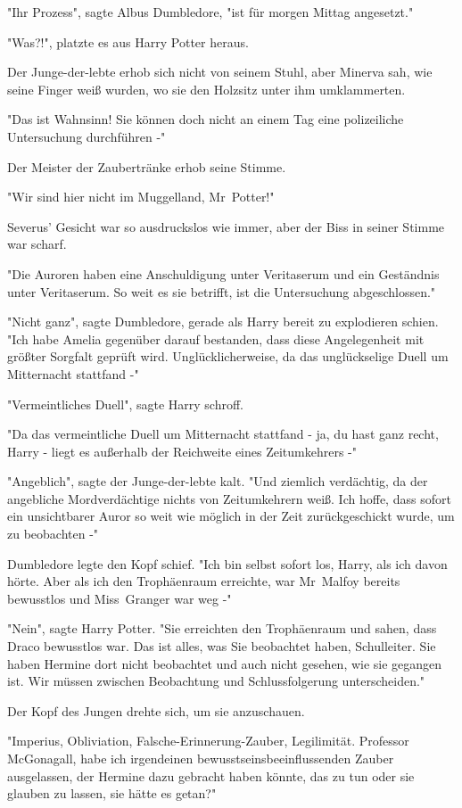 {"Ihr Prozess", sagte Albus Dumbledore, "ist für morgen Mittag angesetzt."

"Was?!", platzte es aus Harry Potter heraus.

Der Junge-der-lebte erhob sich nicht von seinem Stuhl, aber Minerva sah, wie seine Finger weiß wurden, wo sie den Holzsitz unter ihm umklammerten.

"Das ist Wahnsinn! Sie können doch nicht an einem Tag eine polizeiliche Untersuchung durchführen -"

Der Meister der Zaubertränke erhob seine Stimme.

"Wir sind hier nicht im Muggelland, Mr~Potter!"

Severus' Gesicht war so ausdruckslos wie immer, aber der Biss in seiner Stimme war scharf.

"Die Auroren haben eine Anschuldigung unter Veritaserum und ein Geständnis unter Veritaserum. So weit es sie betrifft, ist die Untersuchung abgeschlossen."

"Nicht ganz", sagte Dumbledore, gerade als Harry bereit zu explodieren schien. "Ich habe Amelia gegenüber darauf bestanden, dass diese Angelegenheit mit größter Sorgfalt geprüft wird. Unglücklicherweise, da das unglückselige Duell um Mitternacht stattfand -"

"Vermeintliches Duell", sagte Harry schroff.

"Da das vermeintliche Duell um Mitternacht stattfand - ja, du hast ganz recht, Harry - liegt es außerhalb der Reichweite eines Zeitumkehrers -"

"Angeblich", sagte der Junge-der-lebte kalt. "Und ziemlich verdächtig, da der angebliche Mordverdächtige nichts von Zeitumkehrern weiß. Ich hoffe, dass sofort ein unsichtbarer Auror so weit wie möglich in der Zeit zurückgeschickt wurde, um zu beobachten -"

Dumbledore legte den Kopf schief. "Ich bin selbst sofort los, Harry, als ich davon hörte. Aber als ich den Trophäenraum erreichte, war Mr~Malfoy bereits bewusstlos und Miss~Granger war weg -"

"Nein", sagte Harry Potter. "Sie erreichten den Trophäenraum und sahen, dass Draco bewusstlos war. Das ist alles, was Sie beobachtet haben, Schulleiter. Sie haben Hermine dort nicht beobachtet und auch nicht gesehen, wie sie gegangen ist. Wir müssen zwischen Beobachtung und Schlussfolgerung unterscheiden."

Der Kopf des Jungen drehte sich, um sie anzuschauen.

"Imperius, Obliviation, Falsche-Erinnerung-Zauber, Legilimität. Professor McGonagall, habe ich irgendeinen bewusstseinsbeeinflussenden Zauber ausgelassen, der Hermine dazu gebracht haben könnte, das zu tun oder sie glauben zu lassen, sie hätte es getan?"

}
